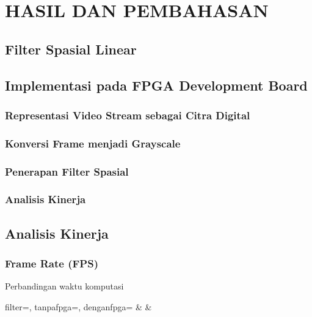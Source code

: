 
\chapter{HASIL DAN PEMBAHASAN}


\section{Filter Spasial Linear}
\blindtext


\section{Implementasi pada FPGA Development Board}
\blindtext
\subsection{Representasi Video Stream sebagai Citra Digital}
\subsection{Konversi Frame menjadi Grayscale}
\subsection{Penerapan Filter Spasial}
\subsection{Analisis Kinerja}


\section{Analisis Kinerja}
\subsection{Frame Rate (FPS)}

\begin{atable}
    \caption{Perbandingan waktu komputasi}
    \label{table:hasil-fps}
        {filter=\filter, tanpafpga=\tanpafpga, denganfpga=\denganfpga}
        {\filter & \tanpafpga & \denganfpga }
\end{atable}

